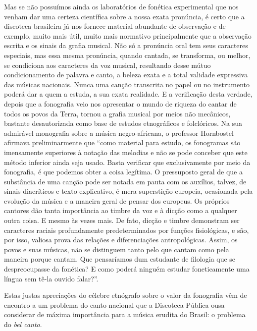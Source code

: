 Mas se não possuímos ainda os laboratórios de fonética experimental que
nos venham dar uma certeza científica sobre a nossa exata pronúncia, é
certo que a discoteca brasileira já nos fornece material abundante de
observação e de exemplo, muito mais útil, muito mais normativo
principalmente que a observação escrita e os sinais da grafia musical.
Não só a pronúncia oral tem seus caracteres especiais, mas essa mesma
pronúncia, quando cantada, se transforma, ou melhor, se condiciona aos
caracteres da voz musical, resultando desse mútuo condicionamento de
palavra e canto, a beleza exata e a total validade expressiva das
músicas nacionais. Nunca uma canção transcrita no papel ou no
instrumento poderá dar a quem a estuda, a sua exata realidade. E a
verificação desta verdade, depois que a fonografia veio nos apresentar o
mundo de riqueza do cantar de todos os povos da Terra, tornou a grafia
musical por meios não mecânicos, bastante desautorizada como base de
estudos etnográficos e folclóricos. Na sua admirável monografia sobre a
música negro-africana, o professor Hornbostel afirmava preliminarmente
que ``como material para estudo, os fonogramas são imensamente
superiores à notação das melodias e não se pode conceber que este método
inferior ainda seja usado. Basta verificar que exclusivamente por meio
da fonografia, é que podemos obter a coisa legítima. O pressuposto geral
de que a substância de uma canção pode ser notada em pauta com os
auxílios, talvez, de sinais diacríticos e texto explicativo, é mera
superstição europeia, ocasionada pela evolução da música e a maneira
geral de pensar dos europeus. Os próprios cantores dão tanta importância
ao timbre da voz e à dicção como a qualquer outra coisa. E mesmo às
vezes mais. De fato, dicção e timbre demonstram ser caracteres raciais
profundamente predeterminados por funções fisiológicas, e são, por isso,
valiosa prova das relações e diferenciações antropológicas. Assim, os
povos e suas músicas, não se distinguem tanto pelo que cantam como pela
maneira porque cantam. Que pensaríamos dum estudante de filologia que se
despreocupasse da fonética? E como poderá ninguém estudar foneticamente
uma língua sem tê-la ouvido falar?''.

Estas justas apreciações do célebre etnógrafo sobre o valor da
fonografia vêm de encontro a um problema do canto nacional que a
Discoteca Pública ousa considerar de máxima importância para a música
erudita do Brasil: o problema do \textit{\textit{bel canto}}.

